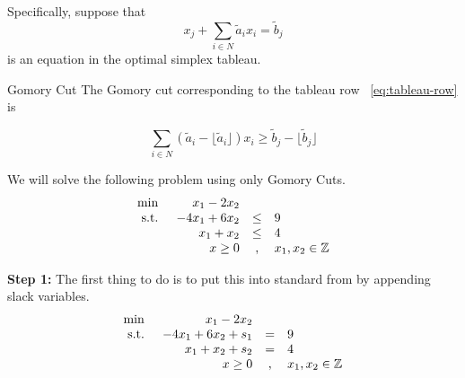 Specifically, suppose that 
\begin{equation}
\label{eq:tableau-row}
 x_j + \sum_{i\in N} \tilde a_i x_i = \tilde b_j
\end{equation}
is an equation in the optimal simplex tableau. 

\begin{general}{Gomory Cut}{}
The Gomory cut corresponding to the tableau row ~\eqref{eq:tableau-row} is

\begin{equation}
\label{eq:gomory-cut}
\sum_{i\in N} (\tilde a_i - \lfloor \tilde a_i \rfloor) x_i \geq \tilde b_j - \lfloor \tilde b_j\rfloor
\end{equation}


\end{general}


We will solve the following problem using only Gomory Cuts.
\begin{equation*}
\begin{array}{lrcl}
\min & x_1 - 2x_2\\
\mbox{ s.t. } & -4x_1 + 6x_2  & \leq & 9\\
& x_1 + x_2   & \leq & 4\\
& x \geq 0 & , & x_1,x_2 \in {\mathbb{Z}}
\end{array}
\end{equation*}

\textbf{Step 1:} The first thing to do is to put this into standard from by appending slack variables.
\begin{equation}
\label{eq:gomory-standard-form}
\begin{array}{lrcl}
\min & x_1 - 2x_2\\
\mbox{ s.t. } & -4x_1 + 6x_2 + s_1 & = & 9\\
& x_1 + x_2 + s_2  & = & 4\\
& x \geq 0 & , & x_1,x_2 \in {\mathbb{Z}}
\end{array}
\end{equation}

